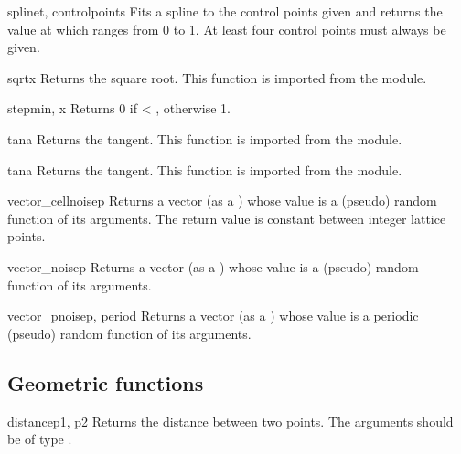 \begin{funcdesc}{spline}{t, controlpoints}
Fits a spline to the control points given and returns the value at 
which ranges from 0 to 1. At least four control points must always be
given.
\end{funcdesc}

\begin{funcdesc}{sqrt}{x}
Returns the square root. This function is imported from the 
module.
\end{funcdesc}

\begin{funcdesc}{step}{min, x}
Returns 0 if  < , otherwise 1.
\end{funcdesc}

\begin{funcdesc}{tan}{a}
Returns the tangent. This function is imported from the  module.
\end{funcdesc}

\begin{funcdesc}{tan}{a}
Returns the tangent. This function is imported from the  module.
\end{funcdesc}

\begin{funcdesc}{vector_cellnoise}{p}
Returns a vector (as a ) whose value is a (pseudo) random function
of its arguments. The return value is constant between integer lattice
points.
\end{funcdesc}

\begin{funcdesc}{vector_noise}{p}
Returns a vector (as a ) whose value is a (pseudo) random function
of its arguments.
\end{funcdesc}

\begin{funcdesc}{vector_pnoise}{p, period}
Returns a vector (as a ) whose value is a periodic (pseudo) random
function of its arguments.
\end{funcdesc}

\subsection{Geometric functions}

\begin{funcdesc}{distance}{p1, p2}
Returns the distance between two points. The arguments should be of type 
.
\end{funcdesc}

